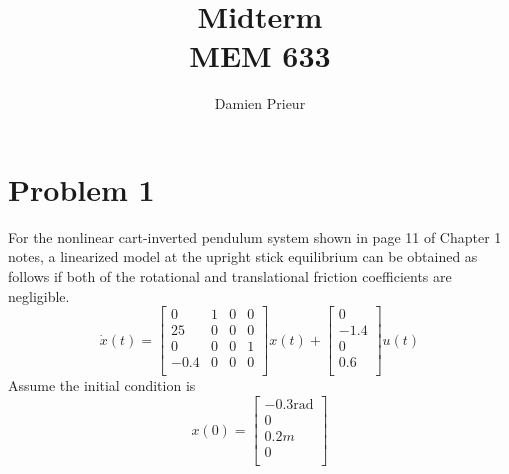 \documentclass{article}
\author{Damien Prieur}
\title{Midterm \\ MEM 633}
\date{}
\begin{document}
\maketitle

\section*{Problem 1}
For the nonlinear cart-inverted pendulum system shown in page 11 of Chapter 1 notes, a linearized model at the upright stick equilibrium can be obtained as follows if both of the rotational and translational friction coefficients are negligible.
$$
\dot{x}(t) =
\begin{bmatrix}
0 & 1 & 0 & 0 \\
25 & 0 & 0 & 0 \\
0 & 0 & 0 & 1 \\
-0.4 & 0 & 0 & 0 \\
\end{bmatrix}
x(t) +
\begin{bmatrix}
0 \\
-1.4 \\
0 \\
0.6 \\
\end{bmatrix}
u(t)
$$
Assume the initial condition is
$$
x(0) =
\begin{bmatrix}
-0.3 \text{rad} \\
0 \\
0.2m \\
0 \\
\end{bmatrix}
$$
\end{document}
